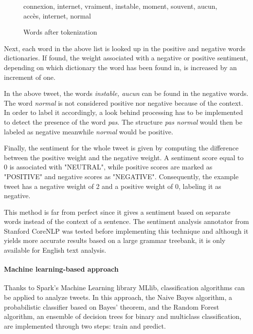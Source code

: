 \documentclass[11pt]{article}
\begin{document}
\vspace{9pt}
\begin{figure}[h!]
    \centering
    \textsf{connexion, internet, vraiment, instable, moment, souvent, aucun, accès, internet, normal}
    \caption{Words after tokenization}
    \label{tokens}
\end{figure}

Next, each word in the above list is looked up in the positive and negative words dictionaries. If found, the weight associated with a negative or positive sentiment, depending on which dictionary the word has been found in, is increased by an increment of one.

In the above tweet, the words \textit{instable, aucun} can be found in the negative words. The word \textit{normal} is not considered positive nor negative because of the context. In order to label it accordingly, a look behind processing has to be implemented to detect the presence of the word \textit{pas}. The structure \textit{pas normal} would then be labeled as negative meanwhile \textit{normal} would be positive.

Finally, the sentiment for the whole tweet is given by computing the difference between the positive weight and the negative weight. A sentiment score equal to 0 is associated with "NEUTRAL", while positive scores are marked as "POSITIVE" and negative scores as "NEGATIVE". Consequently, the example tweet has a negative weight of 2 and a positive weight of 0, labeling it as negative.

\vspace{9pt}
This method is far from perfect since it gives a sentiment based on separate words instead of the context of a sentence. The sentiment analysis annotator from \textsf{Stanford CoreNLP} was tested before implementing this technique and although it yields more accurate results based on a large grammar treebank, it is only available for English text analysis.

\paragraph{Machine learning-based approach}


Thanks to \textsf{Spark}'s Machine Learning library \textsf{MLlib}, classification algorithms can be applied to analyze tweets. In this approach, the Naive Bayes algorithm, a probabilistic classifier based on Bayes' theorem, and the Random Forest algorithm, an ensemble of decision trees for binary and multiclass classification, are implemented through two steps: train and predict.
\end{document}
